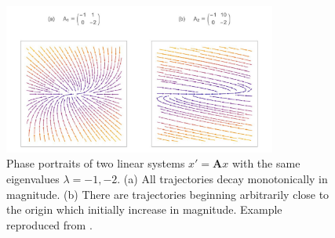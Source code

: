\begin{figure}[ht]
	\centering
	\captionsetup{width=0.8\linewidth}
	\includegraphics[width=0.8\textwidth]{figs/positive_reactivity_real_example}
	\caption{Phase portraits of two linear systems $x' = \textbf{A}x$ with the same eigenvalues  $\lambda = -1, -2$. (a) All trajectories decay monotonically in magnitude. (b) There are trajectories beginning arbitrarily close to the origin which initially increase in magnitude. Example reproduced from \cite{neubertAlternativesResilienceMeasuring1997a}.}
	
	\label{fig:reactivity}
\end{figure} 